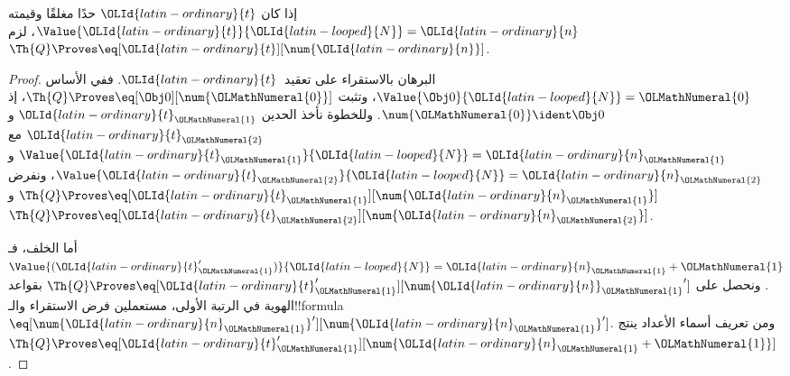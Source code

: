\documentclass[../../../include/open-logic-section]{subfiles}
\begin{document}
\begin{lem}
 إذا كان ${\OLId{latin-ordinary}{t}}$ حدًا مغلقًا وقيمته
$\Value{{\OLId{latin-ordinary}{t}}}{{\OLId{latin-looped}{N}}}={\OLId{latin-ordinary}{n}}$، لزم $\Th{Q}\Proves\eq[{\OLId{latin-ordinary}{t}}][\num {\OLId{latin-ordinary}{n}}]$.
\end{lem}

\begin{proof}
البرهان بالاستقراء على تعقيد~${\OLId{latin-ordinary}{t}}$. ففي الأساس
$\Value{\Obj 0}{{\OLId{latin-looped}{N}}}={\OLMathNumeral{0}}$، وتثبت $\Th{Q}\Proves\eq[\Obj 0][\num {\OLMathNumeral{0}}]$،
إذ $\num {\OLMathNumeral{0}}\ident\Obj 0$.
%
وللخطوة نأخذ الحدين ${\OLId{latin-ordinary}{t}}_{\OLMathNumeral{1}}$ و${\OLId{latin-ordinary}{t}}_{\OLMathNumeral{2}}$ مع
$\Value{{\OLId{latin-ordinary}{t}}_{\OLMathNumeral{1}}}{{\OLId{latin-looped}{N}}}={\OLId{latin-ordinary}{n}}_{\OLMathNumeral{1}}$ و$\Value{{\OLId{latin-ordinary}{t}}_{\OLMathNumeral{2}}}{{\OLId{latin-looped}{N}}}={\OLId{latin-ordinary}{n}}_{\OLMathNumeral{2}}$،
ونفرض $\Th{Q}\Proves\eq[{\OLId{latin-ordinary}{t}}_{\OLMathNumeral{1}}][\num{{\OLId{latin-ordinary}{n}}_{\OLMathNumeral{1}}}]$
و$\Th{Q}\Proves\eq[{\OLId{latin-ordinary}{t}}_{\OLMathNumeral{2}}][\num{{\OLId{latin-ordinary}{n}}_{\OLMathNumeral{2}}}]$.

أما الخلف، فـ$\Value{({\OLId{latin-ordinary}{t}}_{\OLMathNumeral{1}}')}{{\OLId{latin-looped}{N}}}={\OLId{latin-ordinary}{n}}_{\OLMathNumeral{1}}+{\OLMathNumeral{1}}$.
ونحصل على $\Th{Q}\Proves\eq[{\OLId{latin-ordinary}{t}}_{\OLMathNumeral{1}}'][{\num {\OLId{latin-ordinary}{n}}_{\OLMathNumeral{1}}}']$
بقواعد الهوية في الرتبة الأولى، مستعملين فرض الاستقراء والـ!!{formula}
$\eq[\num{{\OLId{latin-ordinary}{n}}_{\OLMathNumeral{1}}}'][\num{{\OLId{latin-ordinary}{n}}_{\OLMathNumeral{1}}}']$.
ومن تعريف أسماء الأعداد ينتج
$\Th{Q}\Proves\eq[{\OLId{latin-ordinary}{t}}_{\OLMathNumeral{1}}'][\num{{\OLId{latin-ordinary}{n}}_{\OLMathNumeral{1}}+{\OLMathNumeral{1}}}]$.


\end{proof}
\end{document}
